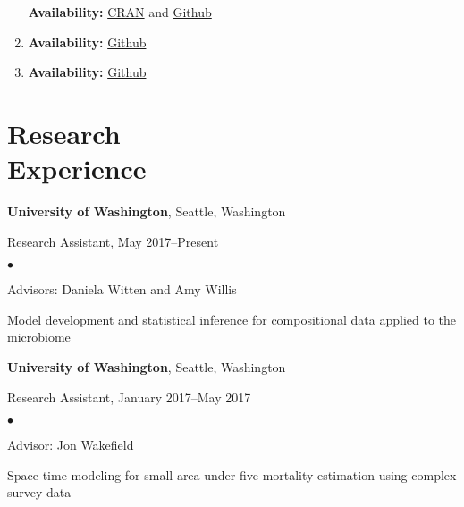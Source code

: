 \documentclass[margin,centered]{res}
\newenvironment{list1}{
  \begin{list}{\ding{113}}{%
      \setlength{\itemsep}{0in}
      \setlength{\parsep}{0in} \setlength{\parskip}{0in}
      \setlength{\topsep}{0in} \setlength{\partopsep}{0in}
      \setlength{\leftmargin}{0.17in}}}{\end{list}}
\newenvironment{list2}{
  \begin{list}{$\bullet$}{%
      \setlength{\itemsep}{0in}
      \setlength{\parsep}{0in} \setlength{\parskip}{0in}
      \setlength{\topsep}{0in} \setlength{\partopsep}{0in}
      \setlength{\leftmargin}{0.2in}}}{\end{list}}
\begin{document}
\begin{resume}
\begin{enumerate}[leftmargin=*]
    \textbf{Availability:} \href{https://CRAN.R-project.org/package=SUMMER}{CRAN} and \href{https://github.com/bryandmartin/SUMMER}{Github}
    \item {}
    
    \textbf{Availability:} \href{https://github.com/adw96/DivNet}{Github}
    
    \item {}
    
    \textbf{Availability:}
    \href{https://github.com/adw96/breakaway}{Github}
\end{enumerate}



\section{\sc Research\\ Experience}
{\bf University of Washington},  Seattle, Washington
\begin{list1}
\item[] 
Research Assistant, May 2017--Present
\begin{list2}
\vspace*{.05in}
\item Advisors: Daniela Witten and Amy Willis
\item Model development and statistical inference for compositional data applied to the microbiome
\end{list2} 
\end{list1}


{\bf University of Washington},  Seattle, Washington
\begin{list1}
\item[] 
Research Assistant, January 2017--May 2017
\begin{list2}
\vspace*{.05in}
\item Advisor: Jon Wakefield
\item Space-time modeling for  small-area under-five mortality estimation using complex survey data
\end{list2} 
\end{list1}


\end{resume}
\end{document}
